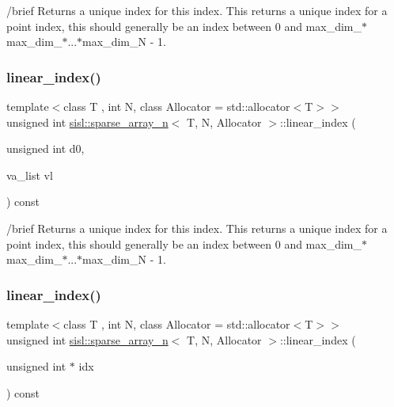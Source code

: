 /brief Returns a unique index for this index. This returns a unique index for a point index, this should generally be an index between 0 and max\+\_\+dim\+\_$\ast$max\+\_\+dim\+\_$\ast$...$\ast$max\+\_\+dim\+\_\+N -\/ 1. \mbox{\label{classsisl_1_1sparse__array__n_a43cf90a26a41032cfc091ebb45112d13}} 
\subsubsection{\texorpdfstring{linear\+\_\+index()}{linear\_index()}\hspace{0.1cm}{\footnotesize\ttfamily [2/3]}}
{\footnotesize\ttfamily template$<$class T , int N, class Allocator  = std\+::allocator$<$\+T$>$$>$ \\
unsigned int \hyperlink{classsisl_1_1sparse__array__n}{sisl\+::sparse\+\_\+array\+\_\+n}$<$ T, N, Allocator $>$\+::linear\+\_\+index (\begin{DoxyParamCaption}\item[{unsigned int}]{d0,  }\item[{va\+\_\+list}]{vl }\end{DoxyParamCaption}) const\hspace{0.3cm}{\ttfamily [inline]}}

/brief Returns a unique index for this index. This returns a unique index for a point index, this should generally be an index between 0 and max\+\_\+dim\+\_$\ast$max\+\_\+dim\+\_$\ast$...$\ast$max\+\_\+dim\+\_\+N -\/ 1. \mbox{\label{classsisl_1_1sparse__array__n_a39aa26464a84f3895ab34b55f5925175}} 
\subsubsection{\texorpdfstring{linear\+\_\+index()}{linear\_index()}\hspace{0.1cm}{\footnotesize\ttfamily [3/3]}}
{\footnotesize\ttfamily template$<$class T , int N, class Allocator  = std\+::allocator$<$\+T$>$$>$ \\
unsigned int \hyperlink{classsisl_1_1sparse__array__n}{sisl\+::sparse\+\_\+array\+\_\+n}$<$ T, N, Allocator $>$\+::linear\+\_\+index (\begin{DoxyParamCaption}\item[{unsigned int $\ast$}]{idx }\end{DoxyParamCaption}) const\hspace{0.3cm}{\ttfamily [inline]}}

